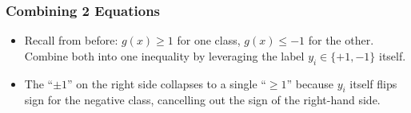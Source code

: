 





\begin{frame}[fragile] \frametitle{Combining 2 Equations}
\begin{itemize}
\item Recall from before: $g(x)\ge 1$ for one class, $g(x)\le -1$ for the other. Combine both into one inequality by leveraging the label $y_i \in \{+1,-1\}$ itself.
\end{itemize}
\begin{center}
\end{center}
\begin{itemize}
\item The ``$\pm 1$'' on the right side collapses to a single ``$\geq 1$'' because $y_i$ itself flips sign for the negative class, cancelling out the sign of the right-hand side.
\end{itemize}
\end{frame}

